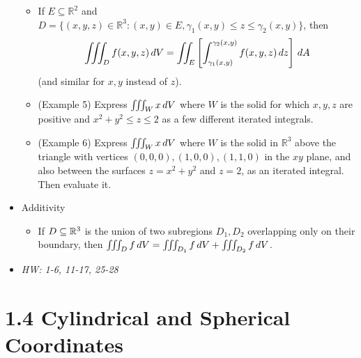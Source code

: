 \documentclass[11pt]{article}
\begin{document}
\begin{itemize}
    \begin{itemize}
      \item
      If \(E\subseteq\mathbb R^2\) and
      \(D=\{(x,y,z)\in\mathbb R^3:(x,y)\in E,\gamma_1(x,y)\leq z\leq\gamma_2(x,y)\}\),
      then
      \[
        \iiint_D f(x,y,z)\,d V
          =
        \iint_E
          \left[\int_{\gamma_1(x,y)}^{\gamma_2(x,y)} f(x,y,z)\,d z\right]
        \,d A
      \]
      (and similar for \(x,y\) instead of \(z\)).
      \item (Example 5) Express \(\iiint_W x\,d V\) where \(W\) is the
      solid for which \(x,y,z\) are positive and \(x^2+y^2\leq z\leq 2\)
      as a few different iterated integrals.
      \item (Example 6) Express \(\iiint_W x\,d V\) where \(W\) is the
      solid in \(\mathbb R^3\) above the triangle with vertices
      \((0,0,0),(1,0,0),(1,1,0)\) in the \(xy\) plane,
      and also between the surfaces \(z=x^2+y^2\)
      and \(z=2\), as an iterated integral. Then evaluate it.
    \end{itemize}
  \item Additivity
    \begin{itemize}
      \item
        If \(D\subseteq\mathbb R^3\) is the union of two subregions
        \(D_1,D_2\) overlapping only on their boundary, then
        \(\iiint_D f\,d V=\iiint_{D_1}f\,d V+\iiint_{D_2}f\,d V\).
    \end{itemize}
  \item\textit{
    HW: 1-6, 11-17, 25-28
  }
\end{itemize}



\section*{1.4 Cylindrical and Spherical Coordinates}
\end{document}
